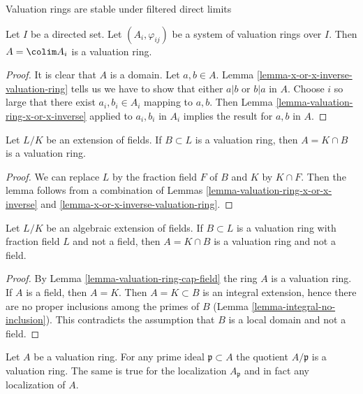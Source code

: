 \begin{lemma}
\label{lemma-colimit-valuation-rings}
\begin{slogan}
Valuation rings are stable under filtered direct limits
\end{slogan}
Let $I$ be a directed set. Let $(A_i, \varphi_{ij})$
be a system of valuation rings over $I$.
Then $A = \colim A_i$ is a valuation ring.
\end{lemma}

\begin{proof}
It is clear that $A$ is a domain. Let $a, b \in A$.
Lemma \ref{lemma-x-or-x-inverse-valuation-ring} tells us we have
to show that either $a | b$ or $b | a$ in $A$. Choose $i$
so large that there exist $a_i, b_i \in A_i$ mapping to $a, b$.
Then Lemma \ref{lemma-valuation-ring-x-or-x-inverse}
applied to $a_i, b_i$ in $A_i$ implies the result for $a, b$ in $A$.
\end{proof}

\begin{lemma}
\label{lemma-valuation-ring-cap-field}
Let $L/K$ be an extension of fields. If $B \subset L$
is a valuation ring, then $A = K \cap B$ is a valuation ring.
\end{lemma}

\begin{proof}
We can replace $L$ by the fraction field $F$ of $B$ and $K$ by
$K \cap F$. Then the lemma follows from a combination of
Lemmas \ref{lemma-valuation-ring-x-or-x-inverse} and
\ref{lemma-x-or-x-inverse-valuation-ring}.
\end{proof}

\begin{lemma}
\label{lemma-valuation-ring-cap-field-finite}
Let $L/K$ be an algebraic extension of fields. If $B \subset L$
is a valuation ring with fraction field $L$ and not a field, then
$A = K \cap B$ is a valuation ring and not a field.
\end{lemma}

\begin{proof}
By Lemma \ref{lemma-valuation-ring-cap-field} the ring $A$ is a valuation
ring. If $A$ is a field, then $A = K$. Then $A = K \subset B$ is an integral
extension, hence there are no proper inclusions among the primes of $B$
(Lemma \ref{lemma-integral-no-inclusion}).
This contradicts the assumption that $B$ is a local domain and not a field.
\end{proof}

\begin{lemma}
\label{lemma-make-valuation-rings}
Let $A$ be a valuation ring. For any prime ideal $\mathfrak p \subset A$ the
quotient $A/\mathfrak p$ is a valuation ring. The same is true for the
localization $A_\mathfrak p$ and in fact any localization of $A$.
\end{lemma}

